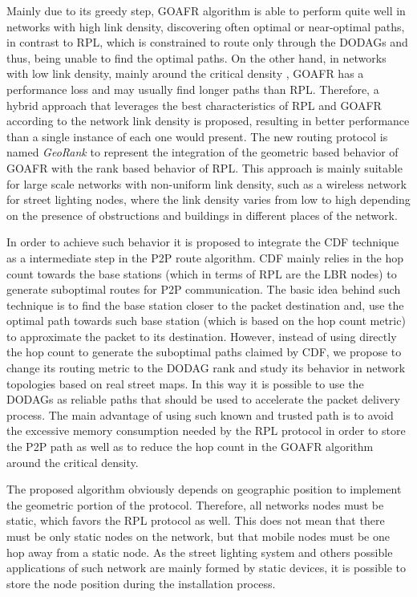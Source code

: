 \documentclass[final,authoryear,3p,twocolumn]{elsarticle}
\begin{document}
Mainly due to its greedy step, GOAFR algorithm is able to perform quite well in networks with high link density, discovering often optimal or near-optimal paths, in contrast to RPL, which is constrained to route only through the DODAGs and thus, being unable to find the optimal paths. On the other hand, in networks with low link density, mainly around the critical density \citep{GOAFR_2008}, GOAFR has a performance loss and may usually find longer paths than RPL. Therefore, a hybrid approach that leverages the best characteristics of RPL and GOAFR according to the network link density is proposed, resulting in better performance than a single instance of each one would present. The new routing protocol is named \textit{GeoRank} to represent the integration of the geometric based behavior of GOAFR with the rank based behavior of RPL. This approach is mainly suitable for large scale networks with non-uniform link density, such as a wireless network for street lighting nodes, where the link density varies from low to high depending on the presence of obstructions and buildings in different places of the network.

In order to achieve such behavior it is proposed to integrate the CDF technique as a intermediate step in the P2P route algorithm. CDF mainly relies in the hop count towards the base stations (which in terms of RPL are the LBR nodes) to generate suboptimal routes for P2P communication. The basic idea behind such technique is to find the base station closer to the packet destination and, use the optimal path towards such base station (which is based on the hop count metric) to approximate the packet to its destination. However, instead of using directly the hop count to generate the suboptimal paths claimed by CDF, we propose to change its routing metric to the DODAG rank and study its behavior in network topologies based on real street maps. In this way it is possible to use the DODAGs as reliable paths that should be used to accelerate the packet delivery process. The main advantage of using such known and trusted path is to avoid the excessive memory consumption needed by the RPL protocol in order to store the P2P path as well as to reduce the hop count in the GOAFR algorithm around the critical density.

The proposed algorithm obviously depends on geographic position to implement the geometric portion of the protocol. Therefore, all networks nodes must be static, which favors the RPL protocol as well. This does not mean that there must be only static nodes on the network, but that mobile nodes must be one hop away from a static node. As the street lighting system and others possible applications of such network are mainly formed by static devices, it is possible to store the node position during the installation process.
\end{document}
